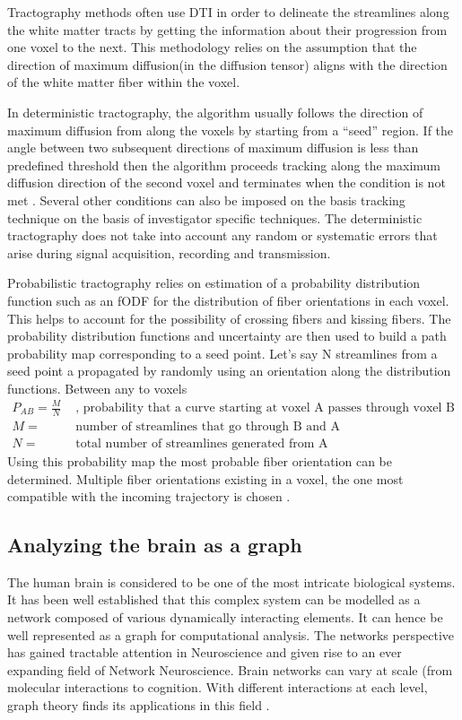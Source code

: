 \documentclass[msthesis.tex]{subfiles}
\begin{document}
Tractography methods often use \gls{DTI} in order to delineate the streamlines along the white matter tracts by getting the information about their progression from one voxel to the next. This methodology relies on the assumption that the direction of maximum diffusion(in the diffusion tensor) aligns with the direction of the white matter fiber within the voxel. 

In deterministic tractography, the algorithm usually follows the direction of maximum diffusion from along the voxels by starting from a “seed” region. If the angle between two subsequent directions of maximum diffusion is less than predefined threshold then the algorithm proceeds tracking along the maximum diffusion direction of the second voxel and terminates when the condition is not met \cite{}. Several other conditions can also be imposed on the basis tracking technique on the basis of investigator specific techniques. The deterministic tractography does not take into account any random or systematic errors that arise during signal acquisition, recording and transmission.

Probabilistic tractography relies on estimation of a probability distribution function such as an fODF for the distribution of fiber orientations in each voxel. This helps to account for the possibility of crossing fibers and kissing fibers. The probability distribution functions and uncertainty are then used to build a path probability map corresponding to a seed point. Let's say N streamlines from a seed point a propagated by randomly using an orientation along the distribution functions. Between any to voxels 
\begin{align*}
P_{AB}= \frac{M}{N} & \textrm{ , probability that a curve starting at voxel A passes through voxel B} \\
M = & \textrm{ number of streamlines that go through B and A} \\
N = &\textrm{ total number of streamlines generated from A}
\end{align*}
Using this probability map the most probable fiber orientation can be determined. Multiple fiber orientations existing in a voxel, the one most compatible with the incoming trajectory is chosen \citep{behrens2003non}.
\subsection{Analyzing the brain as a graph}
\label{sec:braingraph}
The human brain is considered to be one of the most intricate biological systems. It has been well established that this complex system can be modelled as a network composed of various dynamically interacting elements. It can hence be well represented as a graph for computational analysis. The networks perspective has gained tractable attention in Neuroscience and given rise to an ever expanding field of Network Neuroscience. Brain networks can vary at scale (from molecular interactions to cognition. With different interactions at each level, graph theory finds its applications in this field \cite{sporns2018graph}. 
\end{document}

